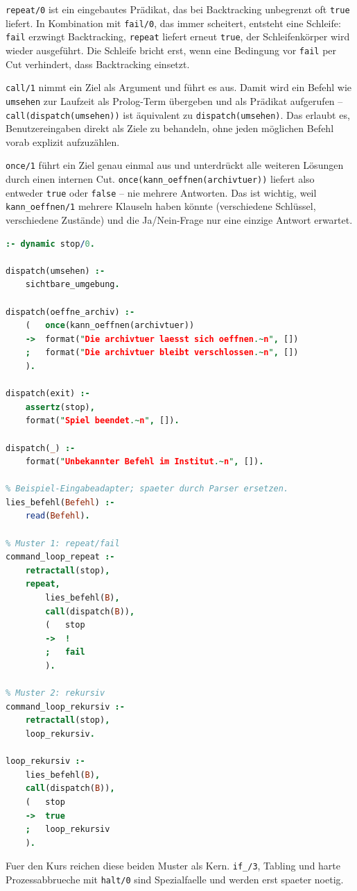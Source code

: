 \documentclass[parskip=half,a4paper,11pt]{scrreprt}
\begin{document}
\texttt{repeat/0} ist ein eingebautes Prädikat, das bei Backtracking unbegrenzt oft \texttt{true} liefert. In Kombination mit \texttt{fail/0}, das immer scheitert, entsteht eine Schleife: \texttt{fail} erzwingt Backtracking, \texttt{repeat} liefert erneut \texttt{true}, der Schleifenkörper wird wieder ausgeführt. Die Schleife bricht erst, wenn eine Bedingung vor \texttt{fail} per Cut verhindert, dass Backtracking einsetzt.

\texttt{call/1} nimmt ein Ziel als Argument und führt es aus. Damit wird ein Befehl wie \texttt{umsehen} zur Laufzeit als Prolog-Term übergeben und als Prädikat aufgerufen -- \texttt{call(dispatch(umsehen))} ist äquivalent  zu \texttt{dispatch(umsehen)}. Das erlaubt es, Benutzereingaben direkt als Ziele zu behandeln, ohne jeden möglichen Befehl vorab explizit aufzuzählen.

\texttt{once/1} führt ein Ziel genau einmal aus und unterdrückt alle weiteren Lösungen durch einen internen Cut. \texttt{once(kann\_oeffnen(archivtuer))} liefert also entweder \texttt{true} oder \texttt{false} -- nie mehrere Antworten. Das ist wichtig, weil \texttt{kann\_oeffnen/1} mehrere Klauseln haben könnte (verschiedene Schlüssel, verschiedene Zustände) und die Ja/Nein-Frage nur eine einzige Antwort erwartet.
\newpage
\begin{lstlisting}[language=Prolog, caption={}]
:- dynamic stop/0.

dispatch(umsehen) :-
    sichtbare_umgebung.

dispatch(oeffne_archiv) :-
    (   once(kann_oeffnen(archivtuer))
    ->  format("Die archivtuer laesst sich oeffnen.~n", [])
    ;   format("Die archivtuer bleibt verschlossen.~n", [])
    ).

dispatch(exit) :-
    assertz(stop),
    format("Spiel beendet.~n", []).

dispatch(_) :-
    format("Unbekannter Befehl im Institut.~n", []).

% Beispiel-Eingabeadapter; spaeter durch Parser ersetzen.
lies_befehl(Befehl) :-
    read(Befehl).

% Muster 1: repeat/fail
command_loop_repeat :-
    retractall(stop),
    repeat,
        lies_befehl(B),
        call(dispatch(B)),
        (   stop
        ->  !
        ;   fail
        ).

% Muster 2: rekursiv
command_loop_rekursiv :-
    retractall(stop),
    loop_rekursiv.

loop_rekursiv :-
    lies_befehl(B),
    call(dispatch(B)),
    (   stop
    ->  true
    ;   loop_rekursiv
    ).
\end{lstlisting}
Fuer den Kurs reichen diese beiden Muster als Kern. \texttt{if\_/3}, Tabling und harte Prozessabbrueche mit \texttt{halt/0} sind Spezialfaelle und werden erst spaeter noetig.
\end{document}
